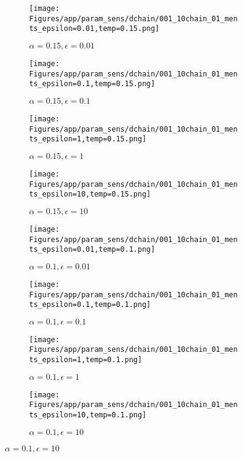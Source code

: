 \documentclass{article}
\theoremstyle{plain}
\begin{document}
\begin{appendices}
\begin{figure}
                \begin{subfigure}[b]{0.24\textwidth}
                    \centering
                    \texttt{[image: Figures/app/param\_sens/dchain/001\_10chain\_01\_ments\_epsilon=0.01,temp=0.15.png]}
                    \caption*{$\alpha=0.15,\epsilon=0.01$}
                \end{subfigure}
                \begin{subfigure}[b]{0.24\textwidth}
                    \centering
                    \texttt{[image: Figures/app/param\_sens/dchain/001\_10chain\_01\_ments\_epsilon=0.1,temp=0.15.png]}
                    \caption*{$\alpha=0.15,\epsilon=0.1$}
                \end{subfigure}
                \begin{subfigure}[b]{0.24\textwidth}
                    \centering
                    \texttt{[image: Figures/app/param\_sens/dchain/001\_10chain\_01\_ments\_epsilon=1,temp=0.15.png]}
                    \caption*{$\alpha=0.15,\epsilon=1$}
                \end{subfigure}
                \begin{subfigure}[b]{0.24\textwidth}
                    \centering
                    \texttt{[image: Figures/app/param\_sens/dchain/001\_10chain\_01\_ments\_epsilon=10,temp=0.15.png]}
                    \caption*{$\alpha=0.15,\epsilon=10$}
                \end{subfigure}
                
                \begin{subfigure}[b]{0.24\textwidth}
                    \centering
                    \texttt{[image: Figures/app/param\_sens/dchain/001\_10chain\_01\_ments\_epsilon=0.01,temp=0.1.png]}
                    \caption*{$\alpha=0.1,\epsilon=0.01$}
                \end{subfigure}
                \begin{subfigure}[b]{0.24\textwidth}
                    \centering
                    \texttt{[image: Figures/app/param\_sens/dchain/001\_10chain\_01\_ments\_epsilon=0.1,temp=0.1.png]}
                    \caption*{$\alpha=0.1,\epsilon=0.1$}
                \end{subfigure}
                \begin{subfigure}[b]{0.24\textwidth}
                    \centering
                    \texttt{[image: Figures/app/param\_sens/dchain/001\_10chain\_01\_ments\_epsilon=1,temp=0.1.png]}
                    \caption*{$\alpha=0.1,\epsilon=1$}
                \end{subfigure}
                \begin{subfigure}[b]{0.24\textwidth}
                    \centering
                    \texttt{[image: Figures/app/param\_sens/dchain/001\_10chain\_01\_ments\_epsilon=10,temp=0.1.png]}
                    \caption*{$\alpha=0.1,\epsilon=10$}
                \end{subfigure}
                

\end{figure}
\end{appendices}
\end{document}

